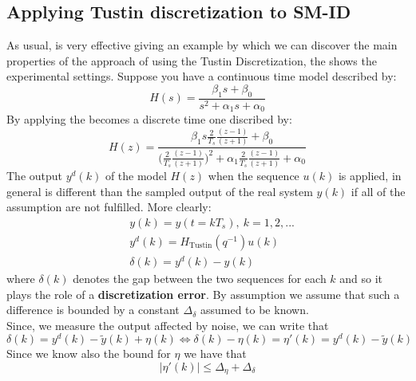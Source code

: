 \subsection{Applying Tustin discretization to SM-ID}
As usual, is very effective giving an example by which we can discover the main properties of the approach of using the Tustin Discretization, the  shows the experimental settings. Suppose you have a continuous time model described by:
\begin{equation}\label{eq:ex_ct_model}
    H(s)=\frac{\beta_1{s}+\beta_0}{s^2+\alpha_1{s}+\alpha_0}
\end{equation}
By applying  the  becomes a discrete time one discribed by:
\begin{equation}
    H(z)=\frac{
        {\beta_1{s\frac{2}{T_s}\frac{(z-1)}{(z+1)}}+\beta_0}
    }{
        \Big(\frac{2}{T_s}\frac{(z-1)}{(z+1)}\Big)^2+\alpha_1{\frac{2}{T_s}\frac{(z-1)}{(z+1)}}+\alpha_0
    }
\end{equation}
The output $y^{d}(k)$ of the model $H(z)$ when the sequence $u(k)$ is applied, in general is different than the sampled output of the real system $y(k)$ if all of the assumption are not fulfilled. More clearly:
\begin{align}
    &y(k)=y(t=kT_s), \ k=1,2,...\\
    &y^d{(k)}=H_{\text{Tustin}}(q^{-1})u(k)\\
    &\delta(k)=y^d(k)-y(k)
\end{align}
where $\delta(k)$ denotes the gap between the two sequences for each $k$ and so it plays the role of a \textbf{discretization error}. By assumption we assume that such a difference is bounded by a constant $\Delta_\delta$ assumed to be known.\\
 Since, we measure the output affected by noise, we can write that
\begin{equation}
    \delta(k)=y^d(k)-\tilde{y}(k)+\eta(k) \iff 
    \delta(k)-\eta(k)=\eta'(k)=y^d(k)-\tilde{y}(k)
\end{equation}
Since we know also the bound for $\eta$ we have that 
\begin{equation}
    \vert \eta'(k) \vert \le \Delta_\eta+\Delta_\delta
\end{equation}


